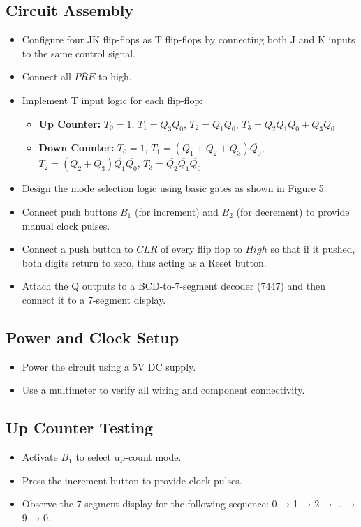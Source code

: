 \documentclass[12pt]{article}
\begin{document}
\subsection*{Circuit Assembly}
\begin{itemize}
    \item Configure four JK flip-flops as T flip-flops by connecting both J and K inputs to the same control signal.
    \item Connect all $\overline{PRE}$ to high. 
    \item Implement T input logic for each flip-flop:
    \begin{itemize}
        \item \textbf{Up Counter:} $T_0 = 1$, $T_1 = \overline{Q_3}Q_0$, $T_2 = Q_1Q_0$, $T_3 = Q_2Q_1Q_0 + Q_3Q_0$
        \item \textbf{Down Counter:} $T_0 = 1$, $T_1 = (Q_1 + Q_2 + Q_3)\overline{Q_0}$, $T_2 = (Q_2 + Q_3)\overline{Q_1}\overline{Q_0}$, $T_3 = \overline{Q_2}\overline{Q_1}\overline{Q_0}$
    \end{itemize}
    \item Design the mode selection logic using basic gates as shown in Figure 5.
    \item Connect push buttons $B_1$ (for increment) and $B_2$ (for decrement) to provide manual clock pulses.
    \item Connect a push button to $\overline{CLR}$ of every flip flop to $High$ so that if it pushed, both digits return to zero, thus acting as a Reset button. 
    \item Attach the Q outputs to a BCD-to-7-segment decoder (7447) and then connect it to a 7-segment display.
\end{itemize}

\subsection*{Power and Clock Setup}
\begin{itemize}
    \item Power the circuit using a 5V DC supply.
    \item Use a multimeter to verify all wiring and component connectivity.
\end{itemize}

\subsection*{Up Counter Testing}
\begin{itemize}
    \item Activate $B_1$ to select up-count mode.
    \item Press the increment button to provide clock pulses.
    \item Observe the 7-segment display for the following sequence: 0 → 1 → 2 → … → 9 → 0.
\end{itemize}
\end{document}
